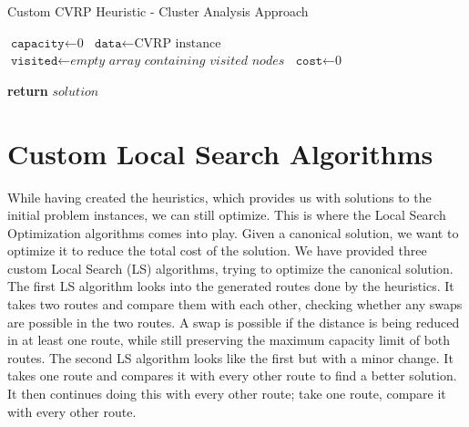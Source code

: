 \documentclass[12pt]{article}
\newcommand{\var}{\texttt}
\begin{document}
	\begin{algorithm}
		\caption{Custom CVRP Heuristic - Cluster Analysis Approach}\label{euclid}
		\begin{algorithmic}[1]
		\State $\var{capacity} \gets \text{0}$
		\State $\var{data} \gets \text{CVRP instance}$
		\State $\var{visited} \gets \textit{empty array containing visited nodes}$
		\State $\var{cost} \gets \textit{0}$
		\While{\texttt{$\var{i} \gets 0$ to $\text{length of data-1}$}}
			
		\EndWhile
	
		\State \textbf{return} $solution$
		\EndFunction
		\end{algorithmic}
		\end{algorithm}

		\section{Custom Local Search Algorithms}
		While having created the heuristics, which provides us with solutions to the initial problem instances, we can still optimize. This is where the Local Search Optimization algorithms comes into play. 
		Given a canonical solution, we want to optimize it to reduce the total cost of the solution. We have provided three custom Local Search (LS) algorithms, trying to optimize the canonical solution. 
		\newline
		The first LS algorithm looks into the generated routes done by the heuristics. It takes two routes and compare them with each other, checking whether any swaps are possible in the two routes. 
		A swap is possible if the distance is being reduced in at least one route, while still preserving the maximum capacity limit of both routes. 
		The second LS algorithm looks like the first but with a minor change. It takes one route and compares it with every other route to find a better solution. It then continues doing this 
		with every other route; take one route, compare it with every other route. 
		 

\newpage


\end{document}
